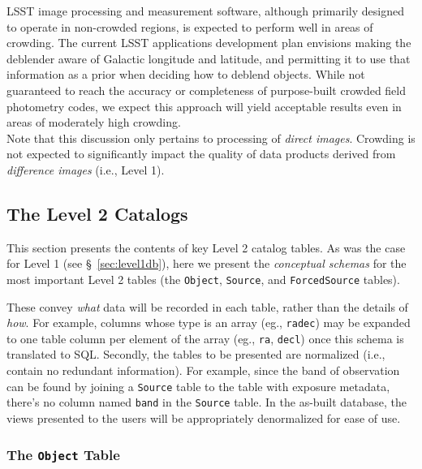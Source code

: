\documentclass[12pt]{article}
\newcommand{\code}[1]{\texttt{#1}}
\newcommand{\Object}{\code{Object}\xspace}
\newcommand{\Source}{\code{Source}\xspace}
\newcommand{\ForcedSource}{\code{ForcedSource}\xspace}
\begin{document}
LSST image processing and measurement software, although primarily designed to operate in non-crowded regions, is expected to perform well in areas of crowding. The current LSST applications development plan envisions making the deblender aware of Galactic longitude and latitude, and permitting it to use that information as a prior when deciding how to deblend objects. While not guaranteed to reach the accuracy or completeness of purpose-built crowded field photometry codes, we expect this approach will yield acceptable results even in areas of moderately high crowding.
\\

Note that this discussion only pertains to processing of {\em direct images}. Crowding is not expected to significantly impact the quality of data products derived from {\em difference images} (i.e., Level 1).

\subsection{The Level 2 Catalogs}

This section presents the contents of key Level 2 catalog tables. As was the case for Level 1 (see \S~\ref{sec:level1db}), here we present the {\em conceptual schemas} for the most important Level 2 tables (the \Object, \Source, and \ForcedSource tables).

These convey {\em what} data will be recorded in each table, rather than the details of {\em how}. For example, columns whose type is an array (eg., \texttt{radec}) may be expanded to one table column per element of the array (eg., \texttt{ra}, \texttt{decl}) once this schema is translated to SQL. Secondly, the tables to be presented are normalized (i.e., contain no redundant information). For example, since the band of observation can be found by joining a \Source table to the table with exposure metadata, there's no column named {\tt band} in the \Source table. In the as-built database, the views presented to the users will be appropriately denormalized for ease of use.

\subsubsection{The \Object Table}
\label{sec:objectTable}
\end{document}
